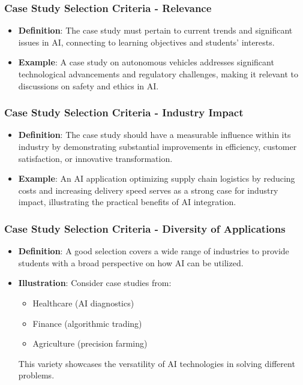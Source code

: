 \documentclass{beamer}
\begin{document}
\begin{frame}[fragile]
    \frametitle{Case Study Selection Criteria - Relevance}
    \begin{itemize}
        \item \textbf{Definition}: The case study must pertain to current trends and significant issues in AI, connecting to learning objectives and students' interests.
        \item \textbf{Example}: A case study on autonomous vehicles addresses significant technological advancements and regulatory challenges, making it relevant to discussions on safety and ethics in AI.
    \end{itemize}
\end{frame}

\begin{frame}[fragile]
    \frametitle{Case Study Selection Criteria - Industry Impact}
    \begin{itemize}
        \item \textbf{Definition}: The case study should have a measurable influence within its industry by demonstrating substantial improvements in efficiency, customer satisfaction, or innovative transformation.
        \item \textbf{Example}: An AI application optimizing supply chain logistics by reducing costs and increasing delivery speed serves as a strong case for industry impact, illustrating the practical benefits of AI integration.
    \end{itemize}
\end{frame}

\begin{frame}[fragile]
    \frametitle{Case Study Selection Criteria - Diversity of Applications}
    \begin{itemize}
        \item \textbf{Definition}: A good selection covers a wide range of industries to provide students with a broad perspective on how AI can be utilized.
        \item \textbf{Illustration}: Consider case studies from:
        \begin{itemize}
            \item Healthcare (AI diagnostics)
            \item Finance (algorithmic trading)
            \item Agriculture (precision farming)
        \end{itemize}
        This variety showcases the versatility of AI technologies in solving different problems.
    \end{itemize}
\end{frame}
\end{document}
